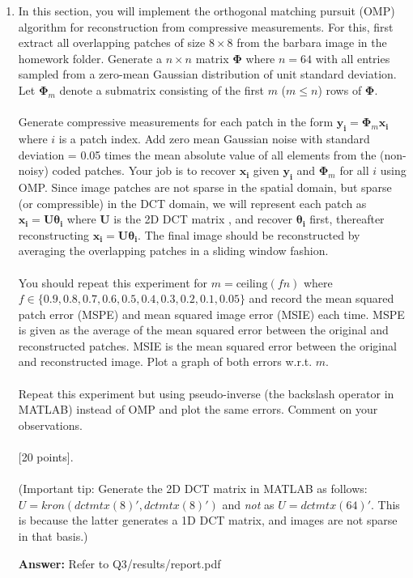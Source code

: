 \documentclass[11pt]{article}
\begin{document}
\begin{enumerate}
\item In this section, you will implement the orthogonal matching pursuit (OMP) algorithm for reconstruction from compressive measurements. For this, first extract all overlapping patches of size $8 \times 8$ from the barbara image in the homework folder. Generate a $n \times n$ matrix $\mathbf{\Phi}$ where $n = 64$ with all entries sampled from a zero-mean Gaussian distribution of unit standard deviation. Let $\mathbf{\Phi}_m$ denote a submatrix consisting of the first $m$ ($m \leq n$) rows of $\mathbf{\Phi}$. 
\\
\\
Generate compressive measurements for each patch in the form $\mathbf{y_i} = \mathbf{\Phi}_m \mathbf{x_i}$ where $i$ is a patch index. Add zero mean Gaussian noise with standard deviation = 0.05 times the mean absolute value of all elements from the (non-noisy) coded patches. Your job is to recover $\mathbf{x_i}$ given $\mathbf{y_i}$ and $\mathbf{\Phi}_m$ for all $i$ using OMP. Since image patches are not sparse in the spatial domain, but sparse (or compressible) in the DCT domain, we will represent each patch as $\mathbf{x_i} = \mathbf{U \theta_i}$ where $\mathbf{U}$ is the 2D DCT matrix , and recover $\mathbf{\theta_i}$ first, thereafter reconstructing $\mathbf{x_i} = \mathbf{U} \mathbf{\theta_i}$. The final image should be reconstructed by averaging the overlapping patches in a sliding window fashion. 
\\
\\
You should repeat this experiment for $m = \textrm{ceiling}(fn)$ where $f \in \{0.9,0.8,0.7,0.6,0.5,0.4,0.3,0.2,0.1,0.05\}$ and record the mean squared patch error (MSPE) and mean squared image error (MSIE) each time. MSPE is given as the average of the mean squared error between the original and reconstructed patches. MSIE is the mean squared error between the original and reconstructed image. Plot a graph of both errors w.r.t. $m$. 
\\
\\
Repeat this experiment but using pseudo-inverse (the backslash operator in MATLAB) instead of OMP and plot the same errors. Comment on your observations.
\\
\\
\textsf{[20 points]}.
\\
\\
(Important tip: Generate the 2D DCT matrix in MATLAB as follows: $U = kron(dctmtx(8)',dctmtx(8)')$ and \emph{not} as $U = dctmtx(64)'$. This is because the latter generates a 1D DCT matrix, and images are not sparse in that basis.)

\textbf{Answer:}
Refer to Q3/results/report.pdf


\end{enumerate}
\end{document}
